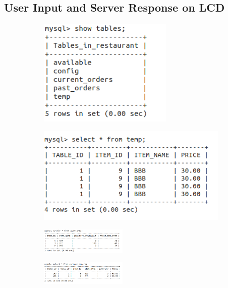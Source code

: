 \documentclass[12pt,a4paper]{article}
\begin{document}
    	\subsection{User Input and Server Response on LCD}
	\begin{figure}[h]
		\centering
		\begin{subfigure}{.5\textwidth}
			\centering
			\includegraphics[width=0.7\textwidth]{all_tables}
		\end{subfigure}%
		\begin{subfigure}{.5\textwidth}
			\centering
			\includegraphics[width=.9\textwidth]{temp_table}
		\end{subfigure}
		\begin{subfigure}{.5\textwidth}
			\centering
			\includegraphics[width=0.45\textwidth]{available_table}
		\end{subfigure}%
		\begin{subfigure}{.5\textwidth}
			\centering
			\includegraphics[width=0.45\textwidth]{current_orders}

\end{subfigure}
\end{figure}
\end{document}
